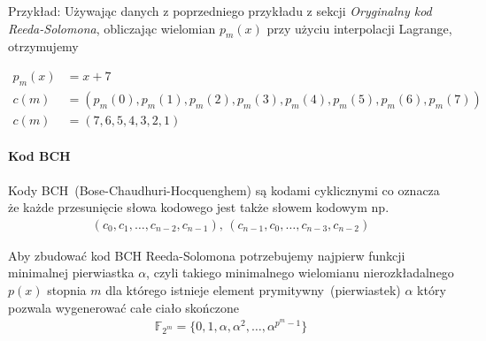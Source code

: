 \begin{minipage}{\textwidth}
Przykład:
\newline
Używając danych z poprzedniego przykładu z sekcji \textit{Oryginalny kod Reeda-Solomona},
obliczając wielomian $p_m(x)$ przy użyciu interpolacji Lagrange, otrzymujemy
\end{minipage}
\begin{align*}
    p_m(x) &= x + 7 \\
    c(m) &= (p_m(0), p_m(1), p_m(2), p_m(3), p_m(4), p_m(5), p_m(6), p_m(7)) \\
    c(m) &= (7, 6, 5, 4, 3, 2, 1)
\end{align*}

\paragraph{Kod BCH}

Kody BCH~(Bose-Chaudhuri-Hocquenghem) są kodami cyklicznymi co oznacza że każde przesunięcie słowa kodowego jest także słowem kodowym np.
\begin{align*}
    (c_0, c_1,\ldots, c_{n-2}, c_{n-1})\text{, }(c_{n-1}, c_0, \ldots, c_{n-3}, c_{n-2})
\end{align*}

Aby zbudować kod BCH Reeda-Solomona potrzebujemy najpierw funkcji minimalnej pierwiastka $\alpha$, czyli takiego minimalnego wielomianu nierozkładalnego $p(x)$ stopnia $m$ dla którego istnieje element prymitywny~(pierwiastek) $\alpha$ który pozwala wygenerować całe ciało skończone
\begin{align*}
    \mathbb{F}_{2^m} = \{0, 1, \alpha, \alpha^2, \ldots, \alpha^{p^{m}-1} \}
\end{align*}


